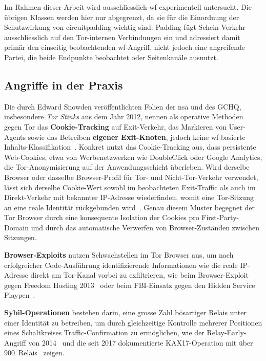 Im Rahmen dieser Arbeit wird ausschliesslich \gls{wf} experimentell untersucht.
Die übrigen Klassen werden hier nur abgegrenzt, da sie für die Einordnung der Schutzwirkung von \gls{circuitpadding} wichtig sind: Padding fügt Schein-Verkehr ausschliesslich auf den Tor-internen Verbindungen ein und adressiert damit primär den einseitig beobachtenden \gls{wf}-Angriff, nicht jedoch eine angreifende Partei, die beide Endpunkte beobachtet oder Seitenkanäle ausnutzt.

\subsection{Angriffe in der Praxis}
\label{sec:angriffe_praxis}

Die durch Edward Snowden veröffentlichten Folien der \gls{nsa} und des GCHQ, insbesondere \emph{Tor Stinks} aus dem Jahr 2012, nennen als operative Methoden gegen Tor das \textbf{Cookie-Tracking} auf Exit-Verkehr, das Markieren von User-Agents sowie das Betreiben \textbf{eigener Exit-Knoten}, jedoch keine \gls{wf}-basierte Inhalts-Klassifikation~\cite{gchq2012torstinks}.
Konkret nutzt das Cookie-Tracking aus, dass persistente Web-Cookies, etwa von Werbenetzwerken wie DoubleClick oder Google Analytics, die Tor-Anonymisierung auf der Anwendungsschicht überleben.
Wird derselbe Browser oder dasselbe Browser-Profil für Tor- und Nicht-Tor-Verkehr verwendet, lässt sich derselbe Cookie-Wert sowohl im beobachteten Exit-Traffic als auch im Direkt-Verkehr mit bekannter IP-Adresse wiederfinden, womit eine Tor-Sitzung an eine reale Identität rückgebunden wird~\cite{gchq2012torstinks}.
Genau diesem Muster begegnet der Tor Browser durch eine konsequente Isolation der Cookies pro First-Party-Domain und durch das automatische Verwerfen von Browser-Zuständen zwischen Sitzungen.

\textbf{Browser-Exploits} nutzen Schwachstellen im Tor Browser aus, um nach erfolgreicher Code-Ausführung identifizierende Informationen wie die reale IP-Adresse direkt am Tor-Kanal vorbei zu exfiltrieren, wie beim Browser-Exploit gegen Freedom Hosting 2013~\cite{torproject2013freedom} oder beim FBI-Einsatz gegen den Hidden Service Playpen~\cite{eff_playpen}.

\textbf{Sybil-Operationen} bestehen darin, eine grosse Zahl bösartiger Relais unter einer Identität zu betreiben, um durch gleichzeitige Kontrolle mehrerer Positionen eines Schaltkreises Traffic-Confirmation zu ermöglichen, wie der Relay-Early-Angriff von 2014~\cite{torproject2014advisory} und die seit 2017 dokumentierte KAX17-Operation mit über 900~Relais~\cite{nusenu2021kax17} zeigen.

